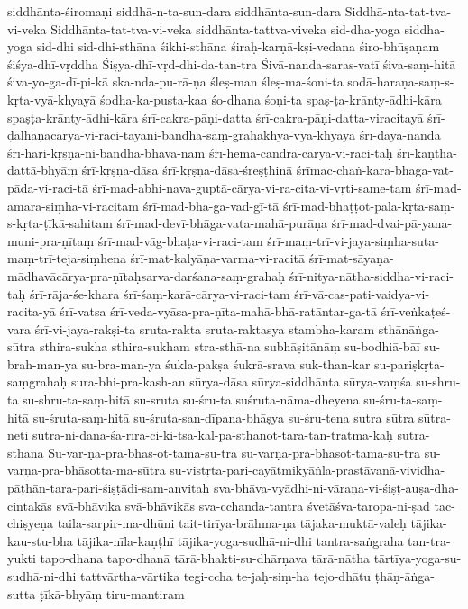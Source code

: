 {siddhānta-śiromaṇi
siddhā-n-ta-sun-dara
siddhānta-sun-dara
Siddhā-nta-tat-tva-vi-veka
Siddhānta-tat-tva-vi-veka
siddhānta-tattva-viveka
sid-dha-yoga
siddha-yoga
sid-dhi
sid-dhi-sthāna
śikhi-sthāna
śiraḥ-karṇā-kṣi-vedana
śiro-bhūṣaṇam
śiśya-dhī-vṛddha
Śiṣya-dhī-vṛd-dhi-da-tan-tra
Śivā-nanda-saras-vatī
śiva-saṃ-hitā
śiva-yo-ga-dī-pi-kā
ska-nda-pu-rā-ṇa
śleṣ-man
śleṣ-ma-śoni-ta
sodā-haraṇa-saṃ-s-kṛta-vyā-khyayā
śodha-ka-pusta-kaa
śo-dhana
śoṇi-ta
spaṣ-ṭa-krānty-ādhi-kāra
spaṣṭa-krānty-ādhi-kāra
śrī-cakra-pāṇi-datta
śrī-cakra-pāṇi-datta-viracitayā
śrī-ḍalhaṇācārya-vi-raci-tayāni-bandha-saṃ-grahākhya-vyā-khyayā
śrī-dayā-nanda
śrī-hari-kṛṣṇa-ni-bandha-bhava-nam
śrī-hema-candrā-cārya-vi-raci-taḥ
śrī-kaṇtha-dattā-bhyāṃ
śrī-kṛṣṇa-dāsa
śrī-kṛṣṇa-dāsa-śreṣṭhinā
śrīmac-chaṅ-kara-bhaga-vat-pāda-vi-raci-tā
śrī-mad-abhi-nava-guptā-cārya-vi-ra-cita-vi-vṛti-same-tam
śrī-mad-amara-siṃha-vi-racitam
śrī-mad-bha-ga-vad-gī-tā
śrī-mad-bhaṭṭot-pala-kṛta-saṃ-s-kṛta-ṭīkā-sahitam
śrī-mad-devī-bhāga-vata-mahā-purāṇa
śrī-mad-dvai-pā-yana-muni-pra-ṇītaṃ
śrī-mad-vāg-bhaṭa-vi-raci-tam
śrī-maṃ-trī-vi-jaya-siṃha-suta-maṃ-trī-teja-siṃhena
śrī-mat-kalyāṇa-varma-vi-racitā
śrī-mat-sāyaṇa-mādhavācārya-pra-ṇītaḥsarva-darśana-saṃ-grahaḥ
śrī-nitya-nātha-siddha-vi-raci-taḥ
śrī-rāja-śe-khara
śrī-śaṃ-karā-cārya-vi-raci-tam
śrī-vā-cas-pati-vaidya-vi-racita-yā
śrī-vatsa
śrī-veda-vyāsa-pra-ṇīta-mahā-bhā-ratāntar-ga-tā
śrī-veṅkaṭeś-vara
śrī-vi-jaya-rakṣi-ta
sruta-rakta
sruta-raktasya
stambha-karam
sthānāṅga-sūtra
sthira-sukha
sthira-sukham
stra-sthā-na
subhāṣitānāṃ
su-bodhiā-bāī
su-brah-man-ya
su-bra-man-ya
śukla-pakṣa
śukrā-srava
suk-than-kar
su-pariṣkṛta-saṃgrahaḥ
sura-bhi-pra-kash-an
sūrya-dāsa
sūrya-siddhānta
sūrya-vaṃśa
su-shru-ta
su-shru-ta-saṃ-hitā
su-sruta
su-śru-ta
suśruta-nāma-dheyena
su-śru-ta-saṃ-hitā
su-śruta-saṃ-hitā
su-śruta-san-dīpana-bhāṣya
su-śru-tena
sutra
sūtra
sūtra-neti
sūtra-ni-dāna-śā-rīra-ci-ki-tsā-kal-pa-sthānot-tara-tan-trātma-kaḥ
sūtra-sthāna
Su-var-ṇa-pra-bhās-ot-tama-sū-tra
su-varṇa-pra-bhāsot-tama-sū-tra
su-varṇa-pra-bhāsotta-ma-sūtra
su-vistṛta-pari-cayātmikyāṅla-prastāvanā-vividha-pāṭhān-tara-pari-śiṣṭādi-sam-anvitaḥ
sva-bhāva-vyādhi-ni-vāraṇa-vi-śiṣṭ-auṣa-dha-cintakās
svā-bhāvika
svā-bhāvikās
sva-cchanda-tantra
śvetāśva-taropa-ni-ṣad
tac-chiṣyeṇa
taila-sarpir-ma-dhūni
tait-tirīya-brāhma-ṇa
tājaka-muktā-valeḥ
tājika-kau-stu-bha
tājika-nīla-kaṇṭhī
tājika-yoga-sudhā-ni-dhi
tantra-saṅgraha
tan-tra-yukti
tapo-dhana
tapo-dhanā
tārā-bhakti-su-dhārṇava
tārā-nātha
tārtīya-yoga-su-sudhā-ni-dhi
tattvārtha-vārtika
tegi-ccha
te-jaḥ-siṃ-ha
tejo-dhātu
ṭhāṇ-āṅga-sutta
ṭīkā-bhyāṃ
tiru-mantiram
}
